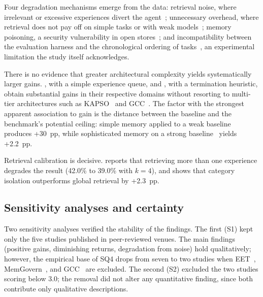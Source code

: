 Four degradation mechanisms emerge from the data: retrieval noise,
where irrelevant or excessive experiences divert the
agent~\citep{lindenbauer2025ctimrover,chen2025sweexp,deshpande2025memtrack};
unnecessary overhead, where retrieval does not pay off on simple tasks
or with weak models~\citep{shen2025talm,xia2025livesweagent}; memory
poisoning, a security vulnerability in open
stores~\citep{srivastava2025memorygraft}; and incompatibility between
the evaluation harness and the chronological ordering of
tasks~\citep{joshi2025swebenchcl}, an experimental limitation the
study itself acknowledges.

There is no evidence that greater architectural complexity yields
systematically larger gains.
\citet{zhang2025accelopt}, with a simple experience queue, and
\citet{guo2026eet}, with a termination heuristic, obtain substantial
gains in their respective domains without resorting to multi-tier
architectures such as KAPSO~\citep{nadafian2026kapso} and
GCC~\citep{wu2025gcc}.
The factor with the strongest apparent association to gain is the
distance between the baseline and the benchmark's potential ceiling:
simple memory applied to a weak
baseline~\citep{zhang2025darwingodel} produces +30~pp, while
sophisticated memory on a strong
baseline~\citep{chen2025sweexp} yields +2.2~pp.

Retrieval calibration is decisive.
\citet{chen2025sweexp} reports that retrieving more than one experience
degrades the result (42.0\% to 39.0\% with $k = 4$), and
\citet{shen2026structurally} shows that category isolation outperforms
global retrieval by +2.3~pp.

\FloatBarrier
\subsection{Sensitivity analyses and certainty}
\label{sec:sensibilidade}

Two sensitivity analyses verified the stability of the findings.
The first (S1) kept only the five studies published in peer-reviewed
venues.
The main findings (positive gains, diminishing returns, degradation
from noise) hold qualitatively; however, the empirical base of SQ4
drops from seven to two studies when
EET~\citep{guo2026eet}, MemGovern~\citep{wang2026memgovern}, and
GCC~\citep{wu2025gcc} are excluded.
The second (S2) excluded the two studies scoring below 3.0;
the removal did not alter any quantitative finding, since both
contribute only qualitative descriptions.

